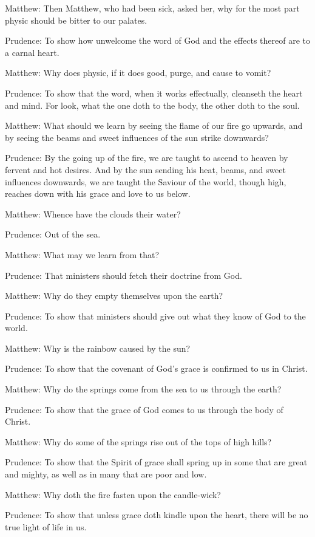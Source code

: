 Matthew: Then Matthew, who had been sick, asked her, why for the most part physic should be bitter to our palates.

Prudence: To show how unwelcome the word of God and the effects thereof are to a carnal heart.

Matthew: Why does physic, if it does good, purge, and cause to vomit?

Prudence: To show that the word, when it works effectually, cleanseth the heart and mind. For look, what the one doth to the body, the other doth to the soul.

Matthew: What should we learn by seeing the flame of our fire go upwards, and by seeing the beams and sweet influences of the sun strike downwards?

Prudence: By the going up of the fire, we are taught to ascend to heaven by fervent and hot desires. And by the sun sending his heat, beams, and sweet influences downwards, we are taught the Saviour of the world, though high, reaches down with his grace and love to us below.

Matthew: Whence have the clouds their water?

Prudence: Out of the sea.

Matthew: What may we learn from that?

Prudence: That ministers should fetch their doctrine from God.

Matthew: Why do they empty themselves upon the earth?

Prudence: To show that ministers should give out what they know of God to the world.

Matthew: Why is the rainbow caused by the sun?

Prudence: To show that the covenant of God's grace is confirmed to us in Christ.

Matthew: Why do the springs come from the sea to us through the earth?

Prudence: To show that the grace of God comes to us through the body of Christ.

Matthew: Why do some of the springs rise out of the tops of high hills?

Prudence: To show that the Spirit of grace shall spring up in some that are great and mighty, as well as in many that are poor and low.

Matthew: Why doth the fire fasten upon the candle-wick?

Prudence: To show that unless grace doth kindle upon the heart, there will be no true light of life in us.

